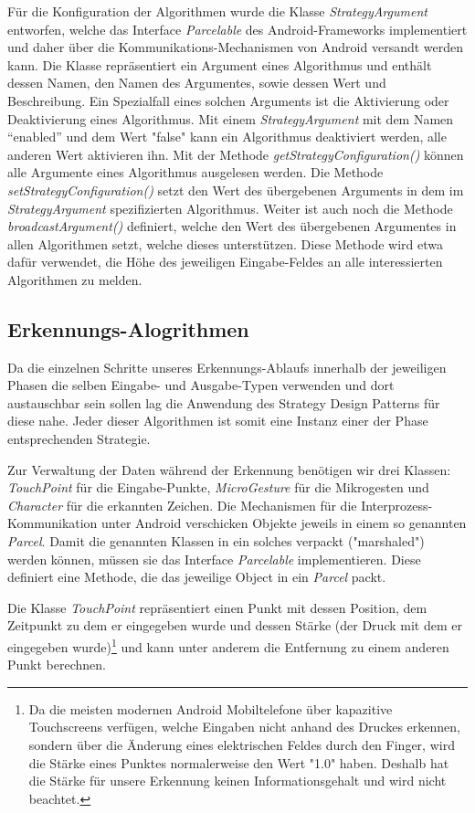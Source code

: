 \label{lbl_be_enable}Für die Konfiguration der Algorithmen wurde die Klasse \emph{StrategyArgument} entworfen, welche das Interface \emph{Parcelable} des Android-Frameworks implementiert und daher über die Kommunikations-Mechanismen von Android versandt werden kann. Die Klasse repräsentiert ein Argument eines Algorithmus und enthält dessen Namen, den Namen des Argumentes, sowie dessen Wert und Beschreibung. Ein Spezialfall eines solchen Arguments ist die Aktivierung oder Deaktivierung eines Algorithmus. Mit einem \emph{StrategyArgument} mit dem Namen ``enabled'' und dem Wert "false" kann ein Algorithmus deaktiviert werden, alle anderen Wert aktivieren ihn. Mit der Methode \emph{getStrategyConfiguration()} können alle Argumente eines Algorithmus ausgelesen werden. Die Methode \emph{setStrategyConfiguration()} setzt den Wert des übergebenen Arguments in dem im \emph{StrategyArgument} spezifizierten Algorithmus. Weiter ist auch noch die Methode \emph{broadcastArgument()} definiert, welche den Wert des übergebenen Argumentes in allen Algorithmen setzt, welche dieses unterstützen. Diese Methode wird etwa dafür verwendet, die Höhe des jeweiligen Eingabe-Feldes an alle interessierten Algorithmen zu melden.

\subsection{Erkennungs-Alogrithmen}

Da die einzelnen Schritte unseres Erkennungs-Ablaufs innerhalb der jeweiligen Phasen die selben Eingabe- und Ausgabe-Typen verwenden und dort austauschbar sein sollen lag die Anwendung des Strategy Design Patterns\cite[S.315-323]{designpatterns} für diese nahe. Jeder dieser Algorithmen ist somit eine Instanz einer der Phase entsprechenden Strategie.

Zur Verwaltung der Daten während der Erkennung benötigen wir drei Klassen: \emph{TouchPoint} für die Eingabe-Punkte, \emph{MicroGesture} für die Mikrogesten und \emph{Character} für die erkannten Zeichen. Die Mechanismen für die Interprozess-Kommunikation unter Android verschicken Objekte jeweils in einem so genannten \emph{Parcel}. Damit die genannten Klassen in ein solches verpackt ("marshaled") werden können, müssen sie das Interface \emph{Parcelable} implementieren. Diese definiert eine Methode, die das jeweilige Object in ein \emph{Parcel} packt.

Die Klasse \emph{TouchPoint} repräsentiert einen Punkt mit dessen Position, dem Zeitpunkt zu dem er eingegeben wurde und dessen Stärke (der Druck mit dem er eingegeben wurde)\footnote{Da die meisten modernen Android Mobiltelefone über kapazitive Touchscreens verfügen, welche Eingaben nicht anhand des Druckes erkennen, sondern über die Änderung eines elektrischen Feldes durch den Finger, wird die Stärke eines Punktes normalerweise den Wert "1.0" haben. Deshalb hat die Stärke für unsere Erkennung keinen Informationsgehalt und wird nicht beachtet.} und kann unter anderem die Entfernung zu einem anderen Punkt berechnen.

